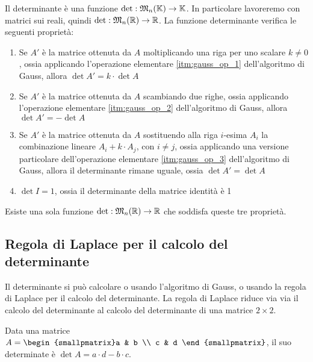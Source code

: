 \begin{defn}[Determinante]
Il determinante \`e una funzione $\operatorname{det} : \mathfrak{M}_{n} (\mathbb{K}) \to \mathbb{K}$. In particolare lavoreremo con matrici sui reali, quindi $\operatorname{det} : \mathfrak{M}_{n} (\mathbb{R}) \to \mathbb{R}$. La funzione determinante verifica le seguenti propriet\`a:
\begin{enumerate}
    \item Se $A'$ \`e la matrice ottenuta da $A$ moltiplicando una riga per uno scalare $k \neq 0$, ossia applicando l'operazione elementare \ref{itm:gauss_op_1} dell'algoritmo di Gauss, allora $\det{A'} = k \cdot \det{A}$
    \item Se $A'$ \`e la matrice ottenuta da $A$ scambiando due righe, ossia applicando l'operazione elementare \ref{itm:gauss_op_2} dell'algoritmo di Gauss, allora $\det{A'} = - \det{A}$
    \item Se $A'$ \`e la matrice ottenuta da $A$ sostituendo alla riga $i$-esima $A_i$ la combinazione lineare $A_i + k \cdot A_j$, con $i \neq j$, ossia applicando una versione particolare dell'operazione elementare \ref{itm:gauss_op_3} dell'algoritmo di Gauss, allora il determinante rimane uguale, ossia $\det{A'} = \det{A}$
    \item $\det{I} = 1$, ossia il determinante della matrice identit\`a \`e 1
\end{enumerate}
\end{defn}

\begin{theorem}
Esiste una sola funzione $\operatorname{det} : \mathfrak{M}_{n} (\mathbb{R}) \to \mathbb{R}$ che soddisfa queste tre propriet\`a.
\end{theorem}

\subsection{Regola di Laplace per il calcolo del determinante}

Il determinante si pu\`o calcolare o usando l'algoritmo di Gauss, o usando la regola di Laplace per il calcolo del determinante. La regola di Laplace riduce via via il calcolo del determinante al calcolo del determinante di una matrice $2 \times 2$.

\begin{fact}
Data una matrice $A = \begin{smallpmatrix}a & b \\ c & d \end{smallpmatrix}$, il suo determinate \`e $\det{A} = a \cdot d - b \cdot c$.
\end{fact}


